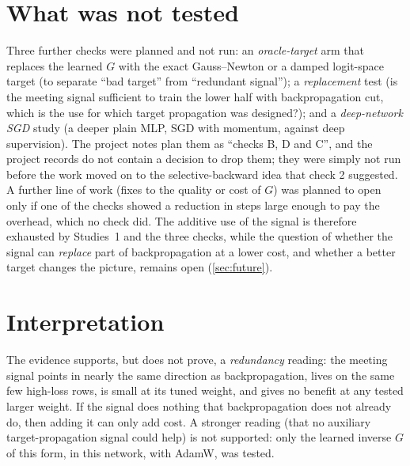 \section{What was not tested}\label{sec:notrun}
Three further checks were planned and not run: an \emph{oracle-target} arm that replaces the learned $G$ with the exact Gauss--Newton or a damped logit-space target (to separate ``bad target'' from ``redundant signal''); a \emph{replacement} test (is the meeting signal sufficient to train the lower half with backpropagation cut, which is the use for which target propagation was designed?); and a \emph{deep-network SGD} study (a deeper plain MLP, SGD with momentum, against deep supervision). The project notes plan them as ``checks B, D and C'', and the project records do not contain a decision to drop them; they were simply not run before the work moved on to the selective-backward idea that check 2 suggested. A further line of work (fixes to the quality or cost of $G$) was planned to open only if one of the checks showed a reduction in steps large enough to pay the overhead, which no check did. The additive use of the signal is therefore exhausted by Studies~1 and the three checks, while the question of whether the signal can \emph{replace} part of backpropagation at a lower cost, and whether a better target changes the picture, remains open (\cref{sec:future}).

\section{Interpretation}
The evidence supports, but does not prove, a \emph{redundancy} reading: the meeting signal points in nearly the same direction as backpropagation, lives on the same few high-loss rows, is small at its tuned weight, and gives no benefit at any tested larger weight. If the signal does nothing that backpropagation does not already do, then adding it can only add cost. A stronger reading (that no auxiliary target-propagation signal could help) is not supported: only the learned inverse $G$ of this form, in this network, with AdamW, was tested.
